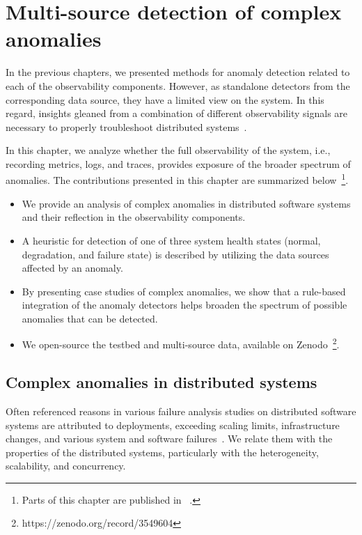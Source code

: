 
\chapter{Multi-source detection of complex anomalies} %
\label{ch:joint} %
\minitoc%
\bigskip

In the previous chapters, we presented methods for anomaly detection related to each of the observability components. However, as standalone detectors from the corresponding data source, they have a limited view on the system. In this regard, insights gleaned from a combination of different observability signals are necessary to properly troubleshoot distributed systems~\cite{sridharan2018distributed}.

In this chapter, we analyze whether the full observability of the system, i.e., recording metrics, logs, and traces, provides exposure of the broader spectrum of anomalies. The contributions presented in this chapter are summarized below~\footnote{Parts of this chapter are published in ~\cite{nedelkoski2020data,nedelkoski2020jointmodalities,nedelkoski2019distributions}.}. 

\begin{itemize}
    \item We provide an analysis of complex anomalies in distributed software systems and their reflection in the observability components.
    \item A heuristic for detection of one of three system health states (normal, degradation, and failure state) is described by utilizing the data sources affected by an anomaly.
    \item By presenting case studies of complex anomalies, we show that a rule-based integration of the anomaly detectors helps broaden the spectrum of possible anomalies that can be detected. 
    \item We open-source the testbed and multi-source data, available on Zenodo~\footnote{https://zenodo.org/record/3549604}.
\end{itemize}

\section{Complex anomalies in distributed systems}
Often referenced reasons in various failure analysis studies on distributed software systems are attributed to deployments, exceeding scaling limits, infrastructure changes, and various system and software failures~\cite{sillito2020failures}. We relate them with the properties of the  distributed systems, particularly with the heterogeneity, scalability, and concurrency. 


